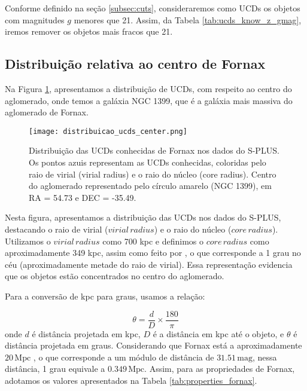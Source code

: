 Conforme definido na seção \ref{subsec:cuts}, consideraremos como UCDs os objetos com magnitudes $g$ menores que 21. Assim, da Tabela \ref{tab:ucds_know_z_gmag}, iremos remover os objetos mais fracos que 21.

\subsection{Distribuição relativa ao centro de Fornax}
Na Figura \ref{distribuicao_ucds_center}, apresentamos a distribuição de UCDs, com respeito ao centro do aglomerado, onde temos a galáxia NGC 1399, que é a galáxia mais massiva do aglomerado de Fornax.

\begin{figure}[!ht]
    \begin{center}
    \texttt{[image: distribuicao\_ucds\_center.png]}
    \caption[]{Distribuição das UCDs conhecidas de Fornax nos dados do S-PLUS. Os pontos azuis representam as UCDs conhecidas, coloridas pelo raio de virial (virial radius) e o raio do núcleo (core radius). Centro do aglomerado representado pelo círculo amarelo (NGC 1399), em \ac{RA} = 54.73 e \ac{DEC} = -35.49.}
    \label{distribuicao_ucds_center}
    \end{center}
\end{figure}

Nesta figura, apresentamos a distribuição das UCDs nos dados do S-PLUS, destacando o raio de virial ($virial \, radius$) e o raio do núcleo ($core \, radius$). Utilizamos o $virial \, radius$ como 700 kpc \citep{Drinkwater_2001} e definimos o $core \, radius$ como aproximadamente 349 kpc, assim como feito por \cite{Saifollahi_2021}, o que corresponde a 1 grau no céu (aproximadamente metade do raio de virial). Essa representação evidencia que os objetos estão concentrados no centro do aglomerado.

Para a conversão de kpc para graus, usamos a relação:

\begin{equation}
    \theta = \frac{d}{D} \times \frac{180}{\pi}
\end{equation}
onde $d$ é distância projetada em kpc, $D$ é a distância em kpc até o objeto, e $\theta$ é distância projetada em graus. Considerando que Fornax está a aproximadamente $20 \, \text{Mpc}$ \citep{Blakeslee_2009}, o que corresponde a um módulo de distância de $31.51 \, \text{mag}$, nessa distância, 1 grau equivale a $0.349 \, \text{Mpc}$. Assim, para as propriedades de Fornax, adotamos os valores apresentados na Tabela \ref{tab:properties_fornax}.

